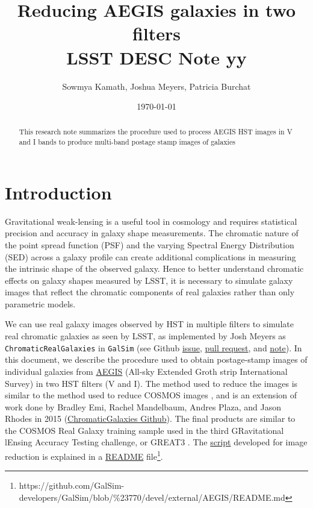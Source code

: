 \documentclass[a4paper,11pt]{article}
\title{Reducing AEGIS galaxies in two filters \\
LSST DESC Note yy}
\author{Sowmya Kamath, Joshua Meyers, Patricia Burchat}
\date{\today}
\begin{document}
\maketitle

\begin{abstract}
This research note summarizes the procedure used to process AEGIS HST images in V and I bands to produce multi-band postage stamp images of galaxies
\end{abstract}

\section{Introduction}
Gravitational weak-lensing is a useful tool in cosmology and requires statistical precision and accuracy in galaxy shape measurements. The chromatic nature of the point spread function (PSF) and the varying Spectral Energy Distribution (SED) across a galaxy profile can create additional complications in measuring the intrinsic shape of the observed galaxy. Hence to better understand chromatic effects on galaxy shapes measured by LSST, it is necessary to simulate galaxy images that reflect the chromatic components of real galaxies rather than only parametric models. 

We can use real galaxy images observed by HST in multiple filters to simulate real chromatic galaxies as seen by LSST, as implemented by Josh Meyers as {\tt ChromaticRealGalaxies} in {\tt GalSim} (see Github
\href{https://github.com/GalSim-developers/GalSim/issues/640}{issue}, 
\href{https://github.com/GalSim-developers/GalSim/pull/687}{pull request},
and 
\href{https://github.com/GalSim-developers/GalSim/blob/\%23640/devel/modules/CGNotes.pdf}{note}). 
In this document, we describe the procedure used to obtain postage-stamp images of individual galaxies from 
\href{http://aegis.ucolick.org/tech_overview.html}{AEGIS} 
(All-sky Extended Groth strip International Survey) in two HST filters (V and I). The method used to reduce the images is similar to the method used  to reduce COSMOS images \citep{Leauthaud2007}, and is an extension of work done by Bradley Emi, Rachel Mandelbaum, Andres Plaza, and Jason Rhodes in 2015 
(\href{https://github.com/bradleyemi/ChromaticGalaxies}{ChromaticGalaxies Github}). The final products are similar to the COSMOS Real Galaxy training sample used in the third GRavitational lEnsing Accuracy Testing challenge, or GREAT3 \citep{Mandelbaum2014}. The \href{https://github.com/sowmyakth/true_gal_colors}{script} developed for image reduction is explained in a \href{https://github.com/GalSim-developers/GalSim/blob/\%23770/devel/external/AEGIS/README.md}{README} file\footnote{https://github.com/GalSim-developers/GalSim/blob/\%23770/devel/external/AEGIS/README.md}.
\end{document}

